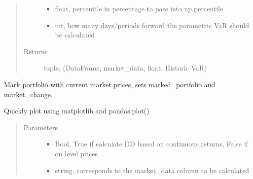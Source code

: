 \documentclass[letterpaper,10pt,english]{sphinxmanual}
\begin{document}
\begin{fulllineitems}
\begin{fulllineitems}
\begin{quote}
\begin{description}
\begin{itemize}
\item {} 
 \textendash{} float, percentile in percentage to pass into np.percentile

\item {} 
 \textendash{} int, how many days/periods forward the parametric VaR should be calculated

\end{itemize}

\item[{Returns}] \leavevmode
tuple, (DataFrame, market\_data, float, Historic VaR)

\end{description}\end{quote}

\end{fulllineitems}


\begin{fulllineitems}
\label{\detokenize{securities:risk_dash.securities.Portfolio.mark}}
Mark portfolio with current market prices, sets marked\_portfolio and market\_change.

\end{fulllineitems}


\begin{fulllineitems}
\label{\detokenize{securities:risk_dash.securities.Portfolio.quick_plot}}
Quickly plot using matplotlib and pandas.plot()
\begin{quote}\begin{description}
\item[{Parameters}] \leavevmode\begin{itemize}
\item {} 
 \textendash{} Bool, True if calculate DD based on continuous returns, False if on level prices

\item {} 
 \textendash{} string, corresponds to the market\_data column to be calculated


\end{itemize}
\end{description}
\end{quote}
\end{fulllineitems}
\end{fulllineitems}
\end{document}
